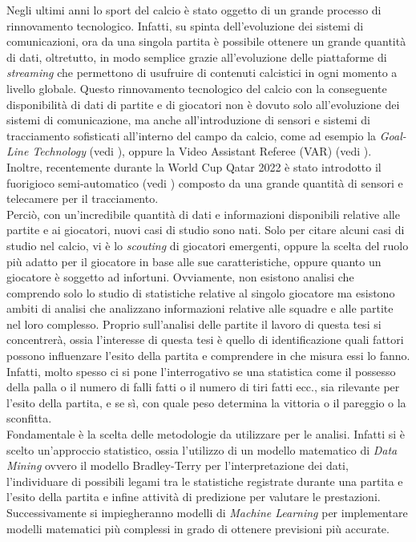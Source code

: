 Negli ultimi anni lo sport del calcio è stato oggetto di un grande processo di rinnovamento tecnologico. Infatti, su spinta dell'evoluzione dei sistemi di comunicazioni, ora da una singola partita è possibile ottenere un grande quantità di dati, oltretutto, in modo semplice grazie all'evoluzione delle piattaforme di \emph{streaming} che permettono di usufruire di contenuti calcistici in ogni momento a livello globale. Questo rinnovamento tecnologico del calcio con la conseguente disponibilità di dati di partite e di giocatori non è dovuto solo all'evoluzione dei sistemi di comunicazione, ma anche all'introduzione di sensori e sistemi di tracciamento sofisticati all'interno del campo da calcio, come ad esempio la \emph{Goal-Line Technology} (vedi \textit{\cite{glt}}), oppure la Video Assistant Referee (VAR) (vedi \textit{\cite{var}}). Inoltre, recentemente durante la World Cup Qatar 2022 è stato introdotto il fuorigioco semi-automatico (vedi \textit{\cite{offside}}) composto da una grande quantità di sensori e telecamere per il tracciamento. \\
Perciò, con un'incredibile quantità di dati e informazioni disponibili relative alle partite e ai giocatori, nuovi casi di studio sono nati. Solo per citare alcuni casi di studio nel calcio, vi è lo \textit{scouting} di giocatori emergenti, oppure la scelta del ruolo più adatto per il giocatore in base alle sue caratteristiche, oppure quanto un giocatore è soggetto ad infortuni. Ovviamente, non esistono analisi che comprendo solo lo studio di statistiche relative al singolo giocatore ma esistono ambiti di analisi che analizzano informazioni relative alle squadre e alle partite nel loro complesso. Proprio sull'analisi delle partite il lavoro di questa tesi si concentrerà, ossia l'interesse di questa tesi è quello di identificazione quali fattori possono influenzare l'esito della partita e comprendere in che misura essi lo fanno. Infatti, molto spesso ci si pone l'interrogativo se una statistica come il possesso della palla o il numero di falli fatti o il numero di tiri fatti ecc., sia rilevante per l'esito della partita, e se sì, con quale peso determina la vittoria o il pareggio o la sconfitta.\\
Fondamentale è la scelta delle metodologie da utilizzare per le analisi. Infatti si è scelto un'approccio statistico, ossia l'utilizzo di un modello matematico di \emph{Data Mining} ovvero il modello Bradley-Terry \autocite{bradley1952rank} per l'interpretazione dei dati, l'individuare di possibili legami tra le statistiche registrate durante una partita e l'esito della partita e infine attività di predizione per valutare le prestazioni. Successivamente si impiegheranno modelli di \emph{Machine Learning} per implementare modelli matematici più complessi in grado di ottenere previsioni più accurate. 

